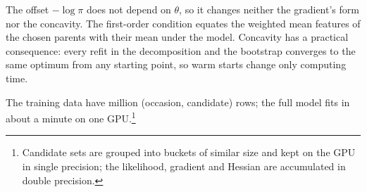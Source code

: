 \noindent The offset $-\log \pi$ does not depend on $\theta$, so it changes neither the gradient's form nor the
concavity. The first-order condition equates the weighted mean features of the chosen parents with their mean under
the model. Concavity has a practical consequence: every refit in the decomposition and the bootstrap converges to
the same optimum from any starting point, so warm starts change only computing time.

\begin{center}
\end{center}

\noindent The training data have \nRowsTrain{} million (occasion, candidate) rows; the full model fits in about a
minute on one GPU.\footnote{Candidate sets are grouped into buckets of similar size and kept on the GPU in single
precision; the likelihood, gradient and Hessian are accumulated in double precision.}

